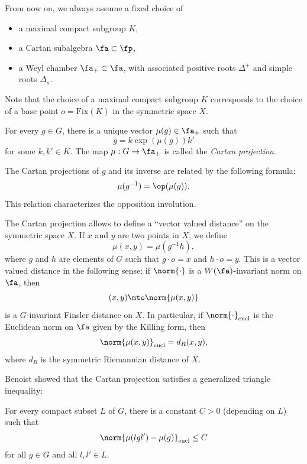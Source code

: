 From now on, we always assume a fixed choice of
\begin{itemize}
\item a maximal compact subgroup $K$,
\item a Cartan subalgebra $\fa \subset \fp$,
\item a Weyl chamber $\fa_+ \subset \fa$, with associated positive roots $\Delta^+$ and simple roots $\Delta_s$.
\end{itemize}
Note that the choice of a maximal compact subgroup $K$ corresponds to the choice of a base point $o = \mathrm{Fix}(K)$ in the symmetric space $X$.

\begin{theo}
For every $g\in G$, there is a unique vector $\mu(g) \in \fa_+$ such that
\[g = k \exp(\mu(g)) k'\]
for some $k,k'\in K$. The map $\mu: G \to \fa_+$ is called the \emph{Cartan projection}.
\end{theo}

\begin{rmk}
The Cartan projections of $g$ and its inverse are related by the following formula:
\[\mu(g^{-1}) = \op(\mu(g)).\]
This relation characterizes the opposition involution.
\end{rmk}

The Cartan projection allows to define a ``vector valued distance'' on the symmetric space $X$. If $x$ and $y$ are two points in $X$, we define
\[\mu(x,y) = \mu(g^{-1}h),\]
where $g$ and $h$ are elements of $G$ such that $g\cdot o = x$ and $h\cdot o = y$. This is a vector valued distance in the following sense: if $\norm{\cdot}$ is a $W(\fa)$-invariant norm on $\fa$, then
\[(x,y) \mto \norm{\mu(x,y)}\]
is a $G$-invariant Finsler distance on $X$. In particular, if $\norm{\cdot}_{\textup{eucl}}$ is the Euclidean norm on $\fa$ given by the Killing form, then
\[\norm{\mu(x,y)}_{\textup{eucl}} = d_R(x,y),\]
where $d_R$ is the symmetric Riemannian distance of $X$.

Benoist showed that the Cartan projection satisfies a generalized triangle inequality:\Changel

\begin{prop}\label{prop - Benoist cartan projection continuous}
For every compact subset $L$ of $G$, there is a constant $C>0$ (depending on $L$) such that
\[\norm{\mu(lgl') - \mu(g)}_{\textup{eucl}} \leq C\]
for all $g\in G$ and all $l,l'\in L$.
\end{prop}

\Changelback

